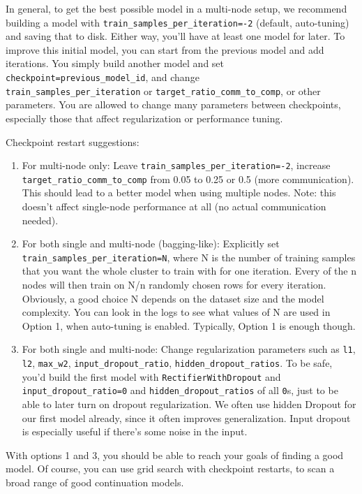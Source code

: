 {{In general, to get the best possible model in a multi-node setup, we recommend building a model with \texttt{train\_samples\_per\_iteration=-2} (default, auto-tuning) and saving that to disk. Either way, you’ll have at least one model for later.
To improve this initial model, you can start from the previous model and add iterations. You simply build another model and set \texttt{checkpoint=previous\_model\_id}, and change \\\texttt{train\_samples\_per\_iteration} or \texttt{target\_ratio\_comm\_to\_comp},
or other parameters. You are allowed to change many parameters between checkpoints, especially those that affect regularization or performance tuning.

Checkpoint restart suggestions:

\begin{enumerate}
\item For multi-node only: Leave \texttt{train\_samples\_per\_iteration=-2}, increase \texttt{target\_ratio\_comm\_to\_comp} from 0.05 to 0.25 or 0.5 (more communication). This should lead to a better model when using multiple nodes. Note: this doesn’t affect single-node performance at all (no actual communication needed).
\item For both single and multi-node (bagging-like): Explicitly set \\\texttt{train\_samples\_per\_iteration=N}, where N is the number of training samples that you want the whole cluster to train with for one iteration. Every of the n nodes will then train on N/n randomly chosen rows for every iteration. Obviously, a good choice N depends on the dataset size and the model complexity. You can look in the logs to see what values of N are used in Option 1, when auto-tuning is enabled. Typically, Option 1 is enough though.
\item For both single and multi-node: Change regularization parameters such as \texttt{l1}, \texttt{l2}, \texttt{max\_w2}, \texttt{input\_dropout\_ratio}, \texttt{hidden\_dropout\_ratios}. To be safe, you’d build the first model with \texttt{RectifierWithDropout} and \texttt{input\_dropout\_ratio=0} and \texttt{hidden\_dropout\_ratios} of all \texttt{0}s, just to be able to later turn on dropout regularization. We often use hidden Dropout for our first model already, since it often improves generalization. Input dropout is especially useful if there’s some noise in the input.
\end{enumerate}

With options 1 and 3, you should be able to reach your goals of finding a good model. Of course, you can use grid search with checkpoint restarts, to scan a broad range of good continuation models.

}}
